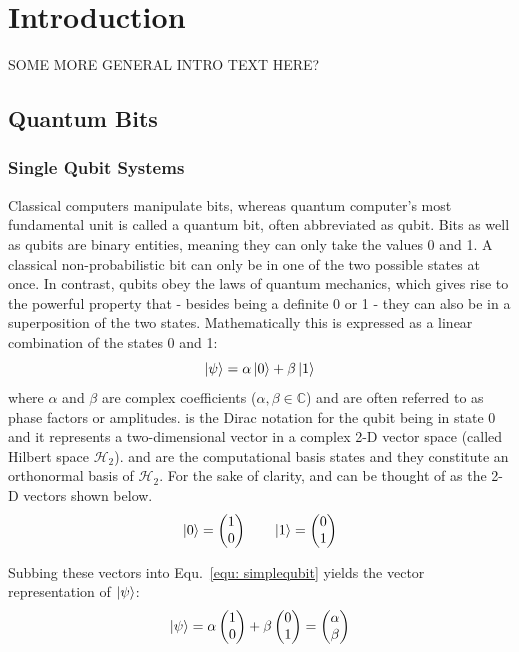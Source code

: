 \chapter{Introduction}\label{sec:introduction}

SOME MORE GENERAL INTRO TEXT HERE?

\section{Quantum Bits}
\label{subsec:qubits}

\subsection{Single Qubit Systems}
\label{subsubsec:qubits}
Classical computers manipulate bits, whereas quantum computer's most fundamental unit is called a quantum bit, often abbreviated as qubit. Bits as well as qubits are binary entities, meaning they can only take the values 0 and 1. A classical non-probabilistic bit can only be in one of the two possible states at once. In contrast, qubits obey the laws of quantum mechanics, which gives rise to the powerful property that - besides being a definite 0 or 1 - they can also be in a superposition of the two states. Mathematically this is expressed as a linear combination of the states 0 and 1:
\begin{equation}
\label{equ: simplequbit}
\ket{\psi} = \alpha \ket{0} + \beta \ket{1}
\end{equation}
where $\alpha$ and $\beta$ are complex coefficients ($\alpha, \beta \in \mathbb{C}$) and are often referred to as phase factors or amplitudes. \0 is the Dirac notation for the qubit being in state 0 and it represents a two-dimensional vector in a complex 2-D vector space (called Hilbert space $\mathcal{H}_{2}$). \0 and \1 are the computational basis states and they constitute an orthonormal basis of $\mathcal{H}_{2}$. For the sake of clarity, \0 and \1 can be thought of as the 2-D vectors shown below.
\begin{equation}
\label{equ: 0and1kets}
\ket{0} =  \begin{pmatrix}1\\0\end{pmatrix} \quad \quad \ket{1} = \begin{pmatrix}0\\1\end{pmatrix}
\end{equation}

Subbing these vectors into Equ.~\ref{equ: simplequbit} yields the vector representation of $\ket{\psi}$:
\begin{equation}
\label{equ: simplequbitvector}
\ket{\psi} = \alpha \begin{pmatrix}1\\0\end{pmatrix} + \beta \begin{pmatrix}0\\1\end{pmatrix} = \begin{pmatrix}\alpha\\\beta\end{pmatrix}
\end{equation}

